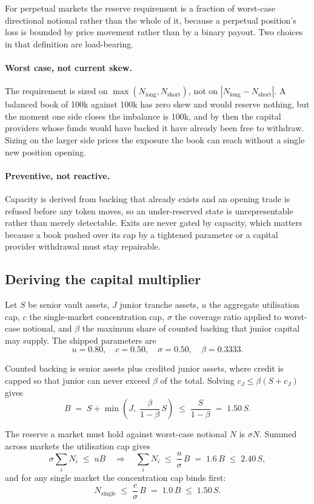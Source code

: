 \documentclass[11pt,a4paper]{article}
\begin{document}
For perpetual markets the reserve requirement is a fraction of worst-case directional
notional rather than the whole of it, because a perpetual position's loss is bounded by price
movement rather than by a binary payout. Two choices in that definition are load-bearing.

\paragraph{Worst case, not current skew.} The requirement is sized on
$\max(N_{\text{long}}, N_{\text{short}})$, not on $|N_{\text{long}} - N_{\text{short}}|$. A
balanced book of 100k against 100k has zero skew and would reserve nothing, but the moment
one side closes the imbalance is 100k, and by then the capital providers whose funds would
have backed it have already been free to withdraw. Sizing on the larger side prices the
exposure the book can reach without a single new position opening.

\paragraph{Preventive, not reactive.} Capacity is derived from backing that already exists
and an opening trade is refused before any token moves, so an under-reserved state is
unrepresentable rather than merely detectable. Exits are never gated by capacity, which
matters because a book pushed over its cap by a tightened parameter or a capital provider
withdrawal must stay repairable.

\subsection{Deriving the capital multiplier}

Let $S$ be senior vault assets, $J$ junior tranche assets, $u$ the aggregate utilisation cap,
$c$ the single-market concentration cap, $\sigma$ the coverage ratio applied to worst-case
notional, and $\beta$ the maximum share of counted backing that junior capital may supply.
The shipped parameters are
\[
  u = 0.80,\quad c = 0.50,\quad \sigma = 0.50,\quad \beta = 0.3333 .
\]

Counted backing is senior assets plus credited junior assets, where credit is capped so that
junior can never exceed $\beta$ of the total. Solving $c_J \le \beta(S + c_J)$ gives
\[
  B \;=\; S + \min\!\left(J,\; \frac{\beta}{1-\beta}\,S\right)
  \;\le\; \frac{S}{1-\beta} \;=\; 1.50\,S .
\]

The reserve a market must hold against worst-case notional $N$ is $\sigma N$. Summed across
markets the utilisation cap gives
\[
  \sigma \sum_i N_i \;\le\; u B
  \quad\Longrightarrow\quad
  \sum_i N_i \;\le\; \frac{u}{\sigma}\,B \;=\; 1.6\,B \;\le\; 2.40\,S ,
\]
and for any single market the concentration cap binds first:
\[
  N_{\text{single}} \;\le\; \frac{c}{\sigma}\,B \;=\; 1.0\,B \;\le\; 1.50\,S .
\]
\end{document}
